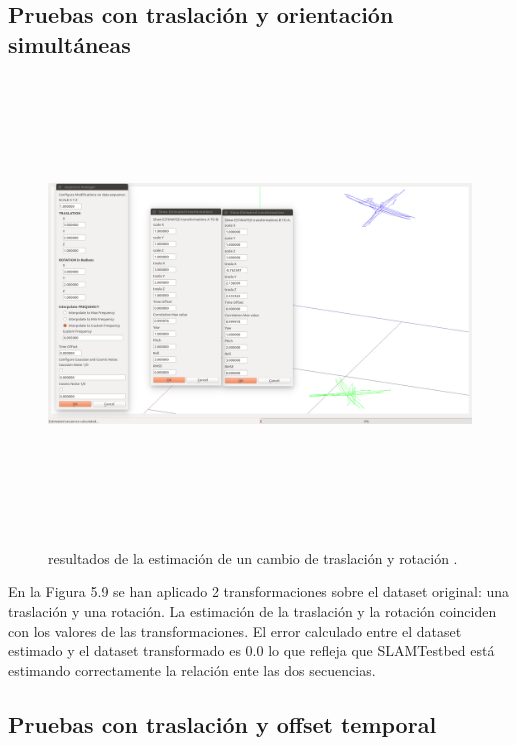 \subsection{Pruebas con traslación y orientación simultáneas}
\begin{figure}[h]
\begin{center}
\label{fig:opciones de View}\includegraphics[height=12.0cm,width=18.0cm]{img/cap6/Trasla_Rota_abba.png}
\hspace{0.5cm}

\end{center}

\caption{ resultados de la estimación de un cambio de traslación y rotación .}
\end{figure}

En la Figura 5.9 se han aplicado 2 transformaciones sobre el dataset original: una traslación y una rotación.
La estimación de la traslación y la rotación coinciden con los valores de las transformaciones. El error calculado entre el dataset estimado y el dataset transformado es 0.0 lo que refleja que SLAMTestbed está estimando correctamente la relación ente las dos secuencias.

\subsection{Pruebas con traslación y offset temporal}

